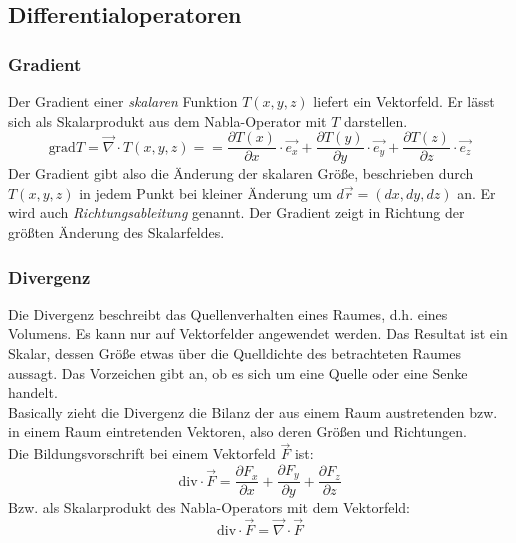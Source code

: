 \documentclass[11pt, a4paper]{article}
\begin{document}
\subsection{Differentialoperatoren}
\subsubsection{Gradient}

\begin{figure}[H]
\centering
{}
\end{figure}

Der Gradient einer \emph{skalaren} Funktion $T(x,y,z)$ liefert ein Vektorfeld. Er lässt sich als Skalarprodukt aus dem Nabla-Operator mit $T$ darstellen.
\[\text{grad}T = \vec{\nabla} \cdot T(x,y,z) =
    = \frac{\partial T(x)}{\partial x} \cdot \vec{e_{x}}+ \frac{\partial T(y)}{\partial y} \cdot \vec{e_{y}}  + \frac{\partial T(z)}{\partial z} \cdot \vec{e_{z}}\]
  Der Gradient gibt also die Änderung der skalaren Größe, beschrieben durch $T(x,y,z)$ in jedem Punkt bei kleiner Änderung um $d\vec{r} = (dx,dy,dz)$ an. Er wird auch \emph{Richtungsableitung} genannt. Der Gradient zeigt in Richtung der größten Änderung des Skalarfeldes.

\subsubsection{Divergenz}

\begin{figure}[H]
\centering
{}
\end{figure}

Die Divergenz beschreibt das Quellenverhalten eines Raumes, d.h. eines Volumens. Es kann nur auf Vektorfelder angewendet werden. Das Resultat ist ein Skalar, dessen Größe etwas über die Quelldichte des betrachteten Raumes aussagt. Das Vorzeichen gibt an, ob es sich um eine Quelle oder eine Senke handelt.\\

Basically zieht die Divergenz die Bilanz der aus einem Raum austretenden bzw. in einem Raum eintretenden Vektoren, also deren Größen und Richtungen.\\

Die Bildungsvorschrift bei einem Vektorfeld $\vec{F}$ ist:
\[\text{div} \cdot \vec{F} = \frac{\partial F_{x}}{\partial x} + \frac{\partial F_{y}}{\partial y} + \frac{\partial F_{z}}{\partial z}\]
Bzw. als Skalarprodukt des Nabla-Operators mit dem Vektorfeld:
\[\text{div} \cdot \vec{F} = \vec{\nabla} \cdot \vec{F}\]
\end{document}
